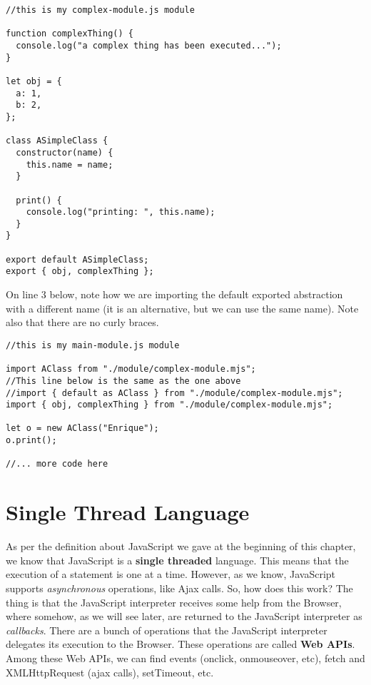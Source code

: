 \documentclass[a4paper, oneside, titlepage, 12pt]{book}
\begin{document}
\begin{verbatim}
//this is my complex-module.js module

function complexThing() {
  console.log("a complex thing has been executed...");
}

let obj = {
  a: 1,
  b: 2,
};

class ASimpleClass {
  constructor(name) {
    this.name = name;
  }

  print() {
    console.log("printing: ", this.name);
  }
}

export default ASimpleClass;
export { obj, complexThing };
\end{verbatim}

On line 3 below, note how we are importing the default exported abstraction with a different name (it is an alternative, but we can use the same name). Note also that there are no curly braces.

\begin{verbatim}
//this is my main-module.js module

import AClass from "./module/complex-module.mjs";
//This line below is the same as the one above
//import { default as AClass } from "./module/complex-module.mjs";
import { obj, complexThing } from "./module/complex-module.mjs";

let o = new AClass("Enrique");
o.print();

//... more code here
\end{verbatim}


\section{Single Thread Language} \label{single_thread}

As per the definition about JavaScript we gave at the beginning of this chapter, we know that JavaScript is a \textbf{single threaded} language. This means that the execution of a statement is one at a time. However, as we know, JavaScript supports \textit{asynchronous} operations, like Ajax calls. So, how does this work? The thing is that the JavaScript interpreter receives some help from the Browser, where somehow, as we will see later, are returned to the JavaScript interpreter as \textit{callbacks}. There are a bunch of operations that the JavaScript interpreter delegates its execution to the Browser. These operations are called \textbf{Web APIs}. Among these Web APIs, we can find events (onclick, onmouseover, etc), fetch and XMLHttpRequest (ajax calls), setTimeout, etc.
\end{document}
